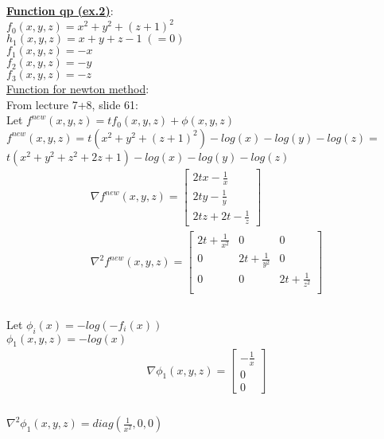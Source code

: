 \documentclass[fleqn]{article}
\begin{document}
\underline{\textbf{Function qp (ex.2)}}:\\
$f_0(x,y,z) = x^2+y^2+(z+1)^2$ \\
$h_1(x,y,z) = x+y+z-1 \; (=0)$ \\
$f_1(x,y,z) = -x $ \\
$f_2(x,y,z) = -y $ \\
$f_3(x,y,z) = -z $ \\

\underline{Function for newton method}:\\

From lecture 7+8, slide 61: \\
Let $f^{new}(x,y,z) = tf_0(x,y,z)+\phi(x,y,z)$\\

$f^{new}(x,y,z) = t(x^2+y^2+(z+1)^2)-log(x)-log(y)-log(z) = $\\ 

$t(x^2+y^2+z^2+2z+1)-log(x)-log(y)-log(z)$\\

\begin{multline*}
\nabla f^{new}(x,y,z) =
\begin{bmatrix}
	2tx-\frac{1}{x} \\
	2ty-\frac{1}{y} \\
	2tz+2t-\frac{1}{z}
\end{bmatrix} \\
\nabla^2 f^{new}(x,y,z) =
\begin{bmatrix} 
	2t+\frac{1}{x^2} & 0                & 0                \\
	0                & 2t+\frac{1}{y^2} & 0                \\
	0                & 0                & 2t+\frac{1}{z^2} \\ 
\end{bmatrix} \\
\end{multline*} \\

Let $\phi_i(x)=-log(-f_i(x))$ \\

$\phi_1(x,y,z) = -log(x)$
\begin{multline*}
\nabla \phi_1(x,y,z) =
\begin{bmatrix} -\frac{1}{x} \\ 0 \\ 0 \end{bmatrix} \\
\end{multline*} \\
$\nabla^2 \phi_1(x,y,z) = diag(\frac{1}{x^2},0,0)$ \\
\end{document}
